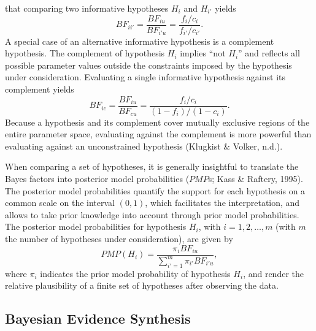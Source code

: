 \documentclass[
]{interact}
\begin{document}
that comparing two informative hypotheses \(H_i\) and \(H_{i'}\) yields
\[
  BF_{ii'} = \frac{BF_{iu}}{BF_{i'u}} = \frac{f_i / c_i}{f_{i'}/c_{i'}}.
  \] A special case of an alternative informative hypothesis is a
complement hypothesis. The complement of hypothesis \(H_i\) implies
``not \(H_i\)'' and reflects all possible parameter values outside the
constraints imposed by the hypothesis under consideration. Evaluating a
single informative hypothesis against its complement yields \[
  BF_{i c} = \frac{BF_{iu}}{BF_{cu}} = \frac{f_i/c_i}{(1 - f_i) / (1 - c_i)}.
  \] Because a hypothesis and its complement cover mutually exclusive
regions of the entire parameter space, evaluating against the complement
is more powerful than evaluating against an unconstrained hypothesis
(Klugkist \& Volker, n.d.).

When comparing a set of hypotheses, it is generally insightful to
translate the Bayes factors into posterior model probabilities
(\(PMP\)s; Kass \& Raftery, 1995). The posterior model probabilities
quantify the support for each hypothesis on a common scale on the
interval \((0,1)\), which facilitates the interpretation, and allows to
take prior knowledge into account through prior model probabilities. The
posterior model probabilities for hypothesis \(H_i\), with
\(i = 1, 2, \dots, m\) (with \(m\) the number of hypotheses under
                        consideration), are given by \[
                          PMP(H_{i}) = \frac{\pi_i BF_{iu}}{\sum^m_{i'=1} \pi_{i'} BF_{i'u}}, 
\] where \(\pi_i\) indicates the prior model probability of hypothesis
\(H_i\), and render the relative plausibility of a finite set of
hypotheses after observing the data.

\hypertarget{bayesian-evidence-synthesis}{%
\subsection{Bayesian Evidence
Synthesis}\label{bayesian-evidence-synthesis}}
\end{document}
